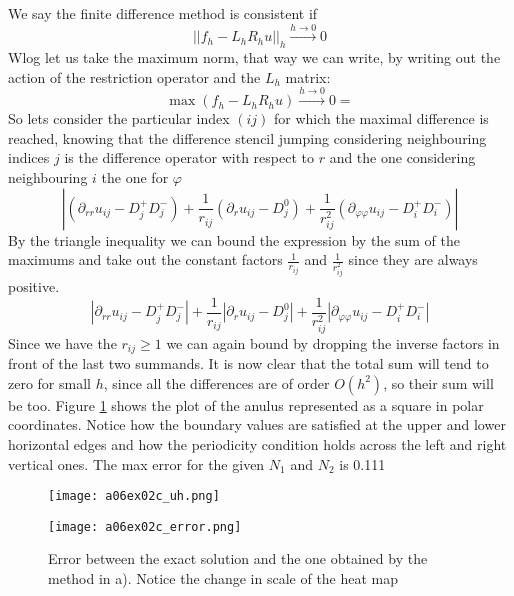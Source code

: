 %
We say the finite difference method is consistent if
%
\begin{equation}
    ||f_h-L_h R_h u||_h \xrightarrow{ h \to 0} 0
\end{equation}
%
Wlog let us take the maximum norm, that way we can write, by writing out the action of the restriction operator and the $L_h$ matrix:
%
\begin{equation}
    \max(f_h-L_hR_hu) \xrightarrow{ h \to 0} 0=
\end{equation}
%
So lets consider the particular index $(ij)$ for which the maximal difference is reached, knowing that the difference stencil jumping considering neighbouring indices $j$ is the difference operator with respect to $r$ and the one considering neighbouring $i$ the one for $\varphi$
%
\begin{equation}
    |(\partial_{rr}u_{ij}-D^{+}_jD^{-}_j)
    +\frac{1}{r_{ij}}(\partial_{r}u_{ij}-D^{0}_j)
    +\frac{1}{r_{ij}^2}(\partial_{\varphi\varphi}u_{ij}-D^{+}_iD^{-}_i)|
\end{equation}
%
By the triangle inequality we can bound the expression by the sum of the maximums and take out the constant factors $\frac{1}{r_{ij}}$ and $\frac{1}{r_{ij}^2}$ since they are always positive.
%
\begin{equation}
    |\partial_{rr}u_{ij}-D^{+}_jD^{-}_j|
    +\frac{1}{r_{ij}}|\partial_{r}u_{ij}-D^{0}_j|
    +\frac{1}{r_{ij}^2}|\partial_{\varphi\varphi}u_{ij}-D^{+}_iD^{-}_i|
\end{equation}
%
Since we have the $r_{ij}\geq 1$ we can again bound by dropping the inverse factors in front of the last two summands. It is now clear that the total sum will tend to zero for small $h$, since all the differences are of order $O(h^2)$, so their sum will be too.
%
%
Figure \ref{fig:a06ex02c_uh} shows the plot of the anulus represented as a square in polar coordinates.
Notice how the boundary values are satisfied at the upper and lower horizontal edges and how the periodicity condition holds across the left and right vertical ones.
The max error for the given $N_1$ and $N_2$ is 0.111
%
\begin{figure}[H]
	\centering
	\texttt{[image: a06ex02c\_uh.png]} 
	\caption{}
	\label{fig:a06ex02c_uh}
\end{figure}
%
\begin{figure}[t]
	\centering
	\texttt{[image: a06ex02c\_error.png]} 
	\caption{Error between the exact solution and the one obtained by the method in a). Notice the change in scale of the heat map}
	\label{fig:a05ex02b}
\end{figure}
